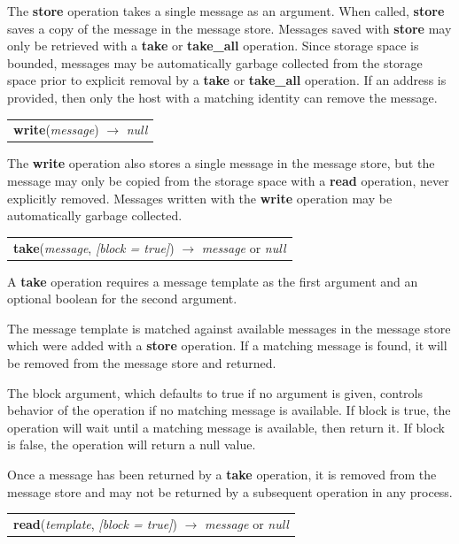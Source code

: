 \documentclass[lnicst]{svmultln}
\begin{document}
The \textbf{store} operation takes a single message as an argument. When called, \textbf{store} saves a copy of the message in the message store. Messages saved with \textbf{store} may only be retrieved with a \textbf{take} or \textbf{take\_all} operation. Since storage space is bounded, messages may be automatically garbage collected from the storage space prior to explicit removal by a \textbf{take} or \textbf{take\_all} operation. If an address is provided, then only the host with a matching identity can remove the message.

\begin{table}
\begin{tabular}{c}
\textbf{write}(\textit{message}) $\rightarrow$ \textit{null}
\end{tabular}
\end{table}

The \textbf{write} operation also stores a single message in the message store, but the message may only be copied from the storage space with a \textbf{read} operation, never explicitly removed. Messages written with the \textbf{write} operation may be automatically garbage collected.

\begin{table}
\begin{tabular}{c}
\textbf{take}(\textit{message}, \textit{[block = true]}) $\rightarrow$ \textit{message} or \textit{null}
\end{tabular}
\end{table}

A \textbf{take} operation requires a message template as the first argument and an optional boolean for the second argument.

The message template is matched against available messages in the message store which were added with a \textbf{store} operation. If a matching message is found, it will be removed from the message store and returned.

The block argument, which defaults to true if no argument is given, controls behavior of the operation if no matching message is available. If block is true, the operation will wait until a matching message is available, then return it. If block is false, the operation will return a null value.

Once a message has been returned by a \textbf{take} operation, it is removed from the message store and may not be returned by a subsequent operation in any process.

\begin{table}
\begin{tabular}{c}
\textbf{read}(\textit{template}, \textit{[block = true]}) $\rightarrow$ \textit{message} or \textit{null}
\end{tabular}
\end{table}
\end{document}
